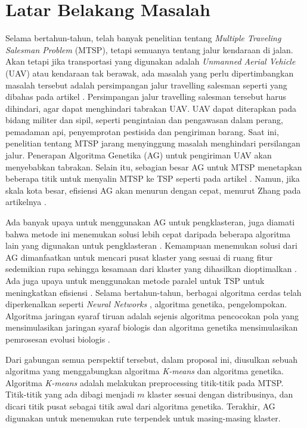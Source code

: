 \section{Latar Belakang Masalah}

Selama bertahun-tahun, telah banyak penelitian tentang \textit{Multiple Traveling Salesman Problem} (MTSP), tetapi semuanya tentang jalur kendaraan di jalan. Akan tetapi jika transportasi yang digunakan adalah \textit{Unmanned Aerial Vehicle} (UAV) atau kendaraan tak berawak, ada masalah yang perlu dipertimbangkan masalah tersebut adalah persimpangan jalur travelling salesman seperti yang dibahas pada artikel \cite{inproceedings}. Persimpangan jalur travelling salesman tersebut harus dihindari, agar dapat menghindari tabrakan UAV. UAV dapat diterapkan pada bidang militer dan sipil, seperti pengintaian dan pengawasan dalam perang, pemadaman api, penyemprotan pestisida dan pengiriman barang.
Saat ini, penelitian tentang MTSP jarang menyinggung masalah menghindari persilangan jalur. Penerapan Algoritma Genetika (AG) untuk pengiriman UAV akan menyebabkan tabrakan. Selain itu, sebagian besar AG untuk MTSP menetapkan beberapa titik untuk menyalin MTSP ke TSP seperti pada artikel \cite{shengping2002hybrid}. Namun, jika skala kota besar, efisiensi AG akan menurun dengan cepat, menurut Zhang pada artikelnya \cite{zhang2014parallel}.

Ada banyak upaya untuk menggunakan AG untuk pengklasteran, juga diamati bahwa metode ini menemukan solusi lebih cepat daripada beberapa algoritma lain yang digunakan untuk pengklasteran \cite{krishna1999genetic}. Kemampuan menemukan solusi dari AG dimanfaatkan untuk mencari pusat klaster yang sesuai di ruang fitur sedemikian rupa sehingga kesamaan dari klaster yang dihasilkan dioptimalkan \cite{maii2000genetic}. Ada juga upaya untuk menggunakan metode paralel untuk TSP untuk meningkatkan efisiensi \cite{li2016parallel}. Selama bertahun-tahun, berbagai algoritma cerdas telah diperkenalkan seperti  \textit{Neural Networks} \cite{song2015asynchronous,zhang2015universality,pan2012spiking}, algoritma genetika, pengelompokan. Algoritma jaringan syaraf tiruan adalah sejenis algoritma pencocokan pola yang mensimulasikan jaringan syaraf biologis dan algoritma genetika mensimulasikan pemrosesan evolusi biologis \cite{liu2015implementation,zeng2014spiking,xu2016probe,zhang2014efficient}.

Dari gabungan semua perspektif tersebut, dalam proposal ini, diusulkan sebuah algoritma yang menggabungkan algoritma \textit{K-means} dan algoritma genetika. Algoritma \textit{K-means} adalah melakukan preprocessing titik-titik pada MTSP. Titik-titik yang ada dibagi menjadi $m$ klaster sesuai dengan distribusinya, dan dicari titik pusat sebagai titik awal dari algoritma genetika. Terakhir, AG digunakan untuk menemukan rute terpendek untuk masing-masing klaster.%